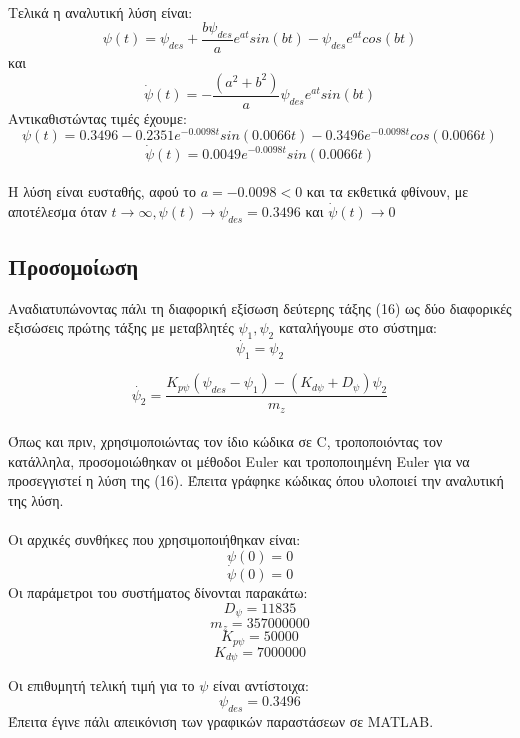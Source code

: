 \documentclass{article}
\begin{document}
\\Τελικά η αναλυτική λύση είναι:
\begin{equation}
\psi(t) = \psi_{des} + \frac{b\psi_{des}}{a}e^{at}sin(bt) - \psi_{des}e^{at}cos(bt)
\end{equation}
και
\begin{equation}
\dot{\psi}(t) = - \frac{(a^2 + b^2)}{a}\psi_{des}e^{at}sin(bt)
\end{equation}
Αντικαθιστώντας τιμές έχουμε:
\[\psi(t) = 0.3496 - 0.2351e^{-0.0098t}sin(0.0066t) - 0.3496e^{-0.0098t}cos(0.0066t)\]
\[\dot{\psi}(t) = 0.0049e^{-0.0098t}sin(0.0066t)\]
\\Η λύση είναι ευσταθής, αφού το \(a = -0.0098 < 0\) και τα εκθετικά φθίνουν, με αποτέλεσμα όταν \(t \rightarrow \infty, \psi(t) \rightarrow \psi_{des} = 0.3496\) και \(\dot{\psi}(t) \rightarrow 0\)
\subsection{Προσομοίωση}
Αναδιατυπώνοντας πάλι τη διαφορική εξίσωση δεύτερης τάξης (16) ως δύο διαφορικές εξισώσεις πρώτης τάξης με μεταβλητές \(\psi_1, \psi_2\) καταλήγουμε στο σύστημα:
\begin{equation}
\dot{\psi_1} = \psi_2
\end{equation}

\begin{equation}
\dot{\psi_2} = \frac{K_{p\psi}(\psi_{des} - \psi_1) - (K_{d\psi} + D_\psi)\psi_2}{m_z}
\end{equation}
\\
Όπως και πριν, χρησιμοποιώντας τον ίδιο κώδικα σε C, τροποποιόντας τον κατάλληλα, προσομοιώθηκαν οι μέθοδοι Euler και τροποποιημένη Euler για να προσεγγιστεί η λύση της (16). Έπειτα γράφηκε κώδικας όπου υλοποιεί την αναλυτική της λύση.   
\\\\Oι αρχικές συνθήκες που χρησιμοποιήθηκαν είναι:
\[\psi(0) = 0\]
\[\dot{\psi}(0) = 0\]
Οι παράμετροι του συστήματος δίνονται παρακάτω:
\[D_\psi = 11835\]
\[m_z = 357000000\]
\[K_{p\psi} = 50000\]
\[K_{d\psi} = 7000000\]

Οι επιθυμητή τελική τιμή για το \(\psi\) είναι αντίστοιχα: 
\[\psi_{des} = 0.3496\]
Έπειτα έγινε πάλι απεικόνιση των γραφικών παραστάσεων σε MATLAB.
\end{document}
